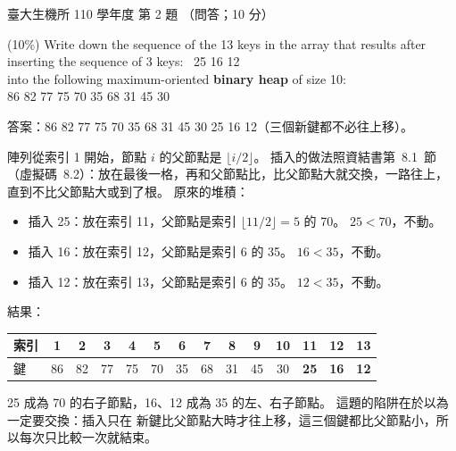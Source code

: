 \begin{pastexam}[label={px:ntu-110-bime-ds-02}]{臺大生機所 110 學年度 第 2 題}
（問答；10 分）

(10\%) Write down the sequence of the 13 keys in the array that results after inserting the sequence
of 3 keys: \ 25 16 12\\
into the following maximum-oriented \textbf{binary heap} of size 10:\\
\hspace*{1em}86 82 77 75 70 35 68 31 45 30
\end{pastexam}

\begin{pastsoln}
答案：86 82 77 75 70 35 68 31 45 30 25 16 12（三個新鍵都不必往上移）。

陣列從索引 1 開始，節點 $i$ 的父節點是 $\lfloor i/2 \rfloor$。 插入的做法照資結書第~8.1~節
（虛擬碼~8.2）：放在最後一格，再和父節點比，比父節點大就交換，一路往上，直到不比父節點大或到了根。
原來的堆積：
\begin{center}
\end{center}

\begin{itemize}
\item 插入 25：放在索引 11，父節點是索引 $\lfloor 11/2 \rfloor = 5$ 的 70。 $25 < 70$，不動。
\item 插入 16：放在索引 12，父節點是索引 6 的 35。 $16 < 35$，不動。
\item 插入 12：放在索引 13，父節點是索引 6 的 35。 $12 < 35$，不動。
\end{itemize}

結果：
\begin{center}
\begin{tabular}{l*{13}{c}}
\toprule
索引 & 1 & 2 & 3 & 4 & 5 & 6 & 7 & 8 & 9 & 10 & 11 & 12 & 13 \\
\midrule
鍵 & 86 & 82 & 77 & 75 & 70 & 35 & 68 & 31 & 45 & 30 & \textbf{25} & \textbf{16} & \textbf{12} \\
\bottomrule
\end{tabular}
\end{center}
25 成為 70 的右子節點，16、12 成為 35 的左、右子節點。 這題的陷阱在於以為一定要交換：插入只在
新鍵比父節點大時才往上移，這三個鍵都比父節點小，所以每次只比較一次就結束。
\end{pastsoln}

